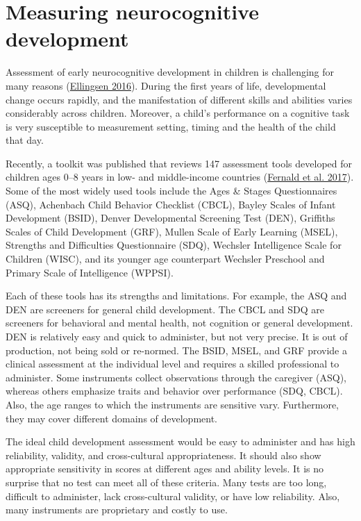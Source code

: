 \documentclass[
]{book}
\begin{document}
\hypertarget{sec:neurocognitive}{%
\section{Measuring neurocognitive development}\label{sec:neurocognitive}}

Assessment of early neurocognitive development in children is challenging for many reasons (\protect\hyperlink{ref-ellingsen2016}{Ellingsen 2016}). During the first years of life, developmental change occurs rapidly, and the manifestation of different skills and abilities varies considerably across children. Moreover, a child's performance on a cognitive task is very susceptible to measurement setting, timing and the health of the child that day.

Recently, a toolkit was published that reviews 147 assessment tools developed for children ages 0--8 years in low- and middle-income countries (\protect\hyperlink{ref-fernald2017toolkit}{Fernald et al. 2017}). Some of the most widely used tools include the Ages \& Stages Questionnaires (ASQ), Achenbach Child Behavior Checklist (CBCL), Bayley Scales of Infant Development (BSID), Denver Developmental Screening Test (DEN), Griffiths Scales of Child Development (GRF), Mullen Scale of Early Learning (MSEL), Strengths and Difficulties Questionnaire (SDQ), Wechsler Intelligence Scale for Children (WISC), and its younger age counterpart Wechsler Preschool and Primary Scale of Intelligence (WPPSI).

Each of these tools has its strengths and limitations. For example, the ASQ and DEN are screeners for general child development. The CBCL and SDQ are screeners for behavioral and mental health, not cognition or general development. DEN is relatively easy and quick to administer, but not very precise. It is out of production, not being sold or re-normed. The BSID, MSEL, and GRF provide a clinical assessment at the individual level and requires a skilled professional to administer. Some instruments collect observations through the caregiver (ASQ), whereas others emphasize traits and behavior over performance (SDQ, CBCL). Also, the age ranges to which the instruments are sensitive vary. Furthermore, they may cover different domains of development.

The ideal child development assessment would be easy to administer and has high reliability, validity, and cross-cultural appropriateness. It should also show appropriate sensitivity in scores at different ages and ability levels. It is no surprise that no test can meet all of these criteria. Many tests are too long, difficult to administer, lack cross-cultural validity, or have low reliability. Also, many instruments are proprietary and costly to use.
\end{document}
